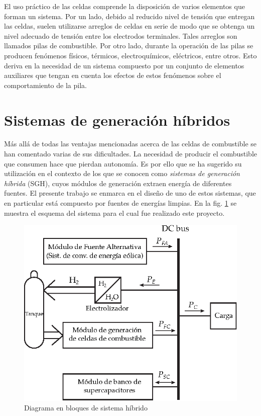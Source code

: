 El uso práctico de las celdas comprende la disposición de varios elementos que forman un sistema. Por un lado, debido al reducido nivel
de tensión que entregan las celdas, suelen utilizarse arreglos de celdas en serie de modo que se obtenga un nivel adecuado de tensión entre
los electrodos terminales. Tales arreglos son llamados pilas de combustible. Por otro lado, durante la operación de las pilas se producen
fenómenos físicos, térmicos, electroquímicos, eléctricos, entre otros. Esto deriva en la necesidad de un sistema compuesto por un conjunto
de elementos auxiliares que tengan en cuenta los efectos de estos fenómenos sobre el comportamiento de la pila.

\section{Sistemas de generación híbridos}
Más allá de todas las ventajas mencionadas acerca de las celdas de combustible se han comentado varias de sus dificultades. La necesidad de
producir el combustible que consumen hace que pierdan autonomía. Es por ello que se ha sugerido su utilización en el contexto de los que se conocen 
como \textit{sistemas de generación híbrida} (SGH), cuyos módulos de generación extraen energía de diferentes fuentes. El presente trabajo 
se enmarca en el diseño de uno de estos sistemas, que en particular está compuesto por fuentes de energías limpias. En la fig. \ref{fig:sist_hibrido}
se muestra el esquema del sistema para el cual fue realizado este proyecto.

\begin{figure}[H]
 \centering
 \includegraphics{gfx/diagrama_bloques_sistema_hibrido.eps}
 \caption{Diagrama en bloques de sistema híbrido}
 \label{fig:sist_hibrido}
\end{figure}

